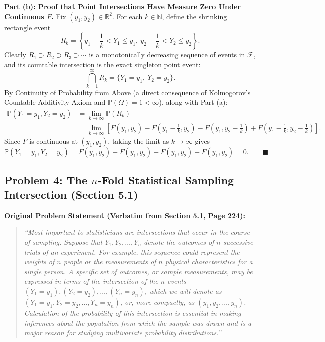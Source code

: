 \documentclass[11pt, letterpaper]{article}
\theoremstyle{definition}
\theoremstyle{remark}
\newcommand{\R}{\mathbb{R}}
\newcommand{\N}{\mathbb{N}}
\newcommand{\Prob}{\mathbb{P}}
\newcommand{\F}{\mathcal{F}}
\begin{document}
\textbf{Part (b): Proof that Point Intersections Have Measure Zero Under Continuous $F$.}
Fix $(y_1, y_2) \in \R^2$. For each $k \in \N$, define the shrinking rectangle event
\[
R_k = \left\{y_1 - \frac{1}{k} < Y_1 \le y_1,\ y_2 - \frac{1}{k} < Y_2 \le y_2\right\}.
\]
Clearly $R_1 \supset R_2 \supset R_3 \supset \cdots$ is a monotonically decreasing sequence of events in $\F$, and its countable intersection is the exact singleton point event:
\[
\bigcap_{k=1}^{\infty} R_k = \{Y_1 = y_1,\ Y_2 = y_2\}.
\]
By Continuity of Probability from Above (a direct consequence of Kolmogorov's Countable Additivity Axiom and $\Prob(\Omega) = 1 < \infty$), along with Part (a):
\begin{align*}
\Prob(Y_1 = y_1, Y_2 = y_2) &= \lim_{k \to \infty} \Prob(R_k) \\
&= \lim_{k \to \infty} \left[F(y_1, y_2) - F\left(y_1 - \frac{1}{k}, y_2\right) - F\left(y_1, y_2 - \frac{1}{k}\right) + F\left(y_1 - \frac{1}{k}, y_2 - \frac{1}{k}\right)\right].
\end{align*}
Since $F$ is continuous at $(y_1, y_2)$, taking the limit as $k \to \infty$ gives
\[
\Prob(Y_1 = y_1, Y_2 = y_2) = F(y_1, y_2) - F(y_1, y_2) - F(y_1, y_2) + F(y_1, y_2) = 0. \qquad \blacksquare
\]

\subsection{Problem 4: The $n$-Fold Statistical Sampling Intersection (Section 5.1)}

\textbf{Original Problem Statement (Verbatim from Section 5.1, Page 224):}
\begin{quote}
\emph{``Most important to statisticians are intersections that occur in the course of sampling. Suppose that $Y_1, Y_2, \dots, Y_n$ denote the outcomes of $n$ successive trials of an experiment. For example, this sequence could represent the weights of $n$ people or the measurements of $n$ physical characteristics for a single person. A specific set of outcomes, or sample measurements, may be expressed in terms of the intersection of the $n$ events $(Y_1 = y_1), (Y_2 = y_2), \dots, (Y_n = y_n)$, which we will denote as $(Y_1 = y_1, Y_2 = y_2, \dots, Y_n = y_n)$, or, more compactly, as $(y_1, y_2, \dots, y_n)$. Calculation of the probability of this intersection is essential in making inferences about the population from which the sample was drawn and is a major reason for studying multivariate probability distributions.''}
\end{quote}
\end{document}
